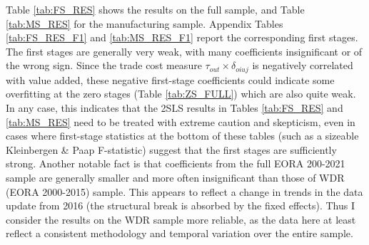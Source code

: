 \documentclass[a4paper]{article}
\begin{document}
Table \ref{tab:FS_RES} shows the results on the full sample, and Table \ref{tab:MS_RES} for the manufacturing sample. Appendix Tables \ref{tab:FS_RES_F1} and \ref{tab:MS_RES_F1} report the corresponding first stages. %
The first stages are generally very weak, with many coefficients insignificant or of the wrong sign. Since the trade cost measure $\tau_{out}\times \delta_{oiuj}$ is negatively correlated with value added, these negative first-stage coefficients could indicate some overfitting at the zero stages (Table \ref{tab:ZS_FULL}) which are also quite weak. In any case, this indicates that the 2SLS results in Tables \ref{tab:FS_RES} and \ref{tab:MS_RES} need to be treated with extreme caution and skepticism, even in cases where first-stage statistics at the bottom of these tables (such as a sizeable Kleinbergen \& Paap F-statistic) suggest that the first stages are sufficiently strong. Another notable fact is that coefficients from the full EORA 200-2021 sample are generally smaller and more often insignificant than those of WDR (EORA 2000-2015) sample. This appears to reflect a change in trends in the data update from 2016 (the structural break is absorbed by the fixed effects). Thus I consider the results on the WDR sample more reliable, as the data here at least reflect a consistent methodology and temporal variation over the entire sample. %

\end{document}
